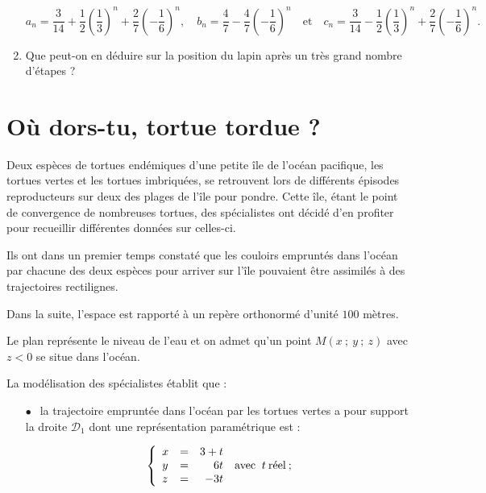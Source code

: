\documentclass{cornouaille}
\begin{document}
\begin{exercice}
\begin{enumerate}
\[a_{n} = \dfrac{3}{14} +\dfrac{1}{2}\left(\dfrac{1}{3}\right)^n + \dfrac{2}{7}\left(- \dfrac{1}{6}\right)^n, \quad b_{n} = \dfrac{4}{7} - \dfrac{4}{7}\left(- \dfrac{1}{6}\right)^n \quad \text{et} \quad c_{n} = \dfrac{3}{14} -\dfrac{1}{2}\left(\dfrac{1}{3}\right)^n + \dfrac{2}{7}\left(- \dfrac{1}{6}\right)^n.\]

\item  Que peut-on en déduire sur la position du lapin après un très grand nombre d'étapes ?
\end{enumerate}
\end{exercice}

\section{Où dors-tu, tortue tordue ?}
\begin{exercice}
Deux espèces de tortues endémiques d'une petite île de l'océan pacifique, les tortues vertes et les tortues imbriquées, se retrouvent lors de différents épisodes reproducteurs sur deux des plages de l'île pour pondre. Cette île, étant le point de convergence de nombreuses tortues, des spécialistes ont décidé d'en profiter pour recueillir différentes données sur celles-ci.

\smallskip

Ils ont dans un premier temps constaté que les couloirs empruntés dans l'océan par chacune des deux espèces pour arriver sur l'île pouvaient être assimilés à des trajectoires rectilignes.

Dans la suite, l'espace est rapporté à un repère orthonormé \Oijk{} d'unité $100$ mètres.

Le plan \Oij{} représente le niveau de l'eau et on admet qu'un point $M(x~;~y~;~z)$ avec $z < 0$ se situe dans l'océan.

La modélisation des spécialistes établit que :

\setlength\parindent{8mm}
\begin{itemize}
\item[$\bullet~~$] la trajectoire empruntée dans l'océan par les tortues vertes a pour support la droite $\mathcal{D}_1$ dont une représentation paramétrique est :

\[\left\{\begin{array}{l c r}
x	&=&3+t\\
y 	&=&6t\\
z	&=&- 3t
\end{array}\right.\:\text{avec } \:t\: \text{réel}\: ;\]


\end{itemize}
\end{exercice}
\end{document}
